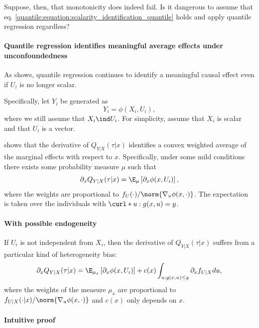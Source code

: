  
 Suppose, then, that monotonicity does indeed fail. Is it dangerous to assume that eq. \eqref{quantile:equation:scalarity_identification_quantile} holds and apply quantile regression regardless? 
 
 
 \paragraph{Quantile regression identifies meaningful average effects under unconfoundedness}

As \cite{Sasaki2015WhatQuantileRegressions} shows, quantile regression continues to identify a meaningful causal effect even if $U_i$ is no longer scalar. 

Specifically, let $Y_i$ be generated as 
\begin{equation}
	Y_i = \phi(X_i, U_i),
\end{equation}
where we  still assume that $X_i\ind U_i$. For simplicity, assume that $X_i$ is scalar and that $U_i$ is a vector. 

\cite{Sasaki2015WhatQuantileRegressions} shows that the derivative of $Q_{Y|X}(\tau|x)$ identifies a convex weighted average of the marginal effects with respect to $x$. Specifically, under some mild conditions there exists some probability measure $\mu$ such that 
\begin{equation}
	\partial_x Q_{Y|X}(\tau|x) = \E_{\mu}\left[\partial_x \phi(x, U_i) \right],
\end{equation}
where the weights are proportional to $f_{U}(\cdot)/\norm{\nabla_u \phi(x, \cdot)}$.  The expectation is taken over the individuals with $\curl*{u: g(x, u)=y}$.  
  
 
 \paragraph{With possible endogeneity}
  	 
  	 If $U_i$ is not independent from $X_i$, then the derivative of $Q_{Y|X}(\tau|x)$ suffers from a particular kind of heterogeneity bias: 
 \begin{equation}
 	\partial_x Q_{Y|X}(\tau|x) =  \E_{\mu_x}\left[\partial_x \phi(x, U_i) \right] + c(x)\int_{u: g(x, u)\leq y} \partial_x f_{U|X} du,
 \end{equation} 
 where the weights of the measure $\mu_x$ are proportional to $f_{U|X}(\cdot|x)/\norm{\nabla_u \phi(x, \cdot)}$ and $c(x)$ only depends on $x$. 
  
 \paragraph{Intuitive proof}
 
